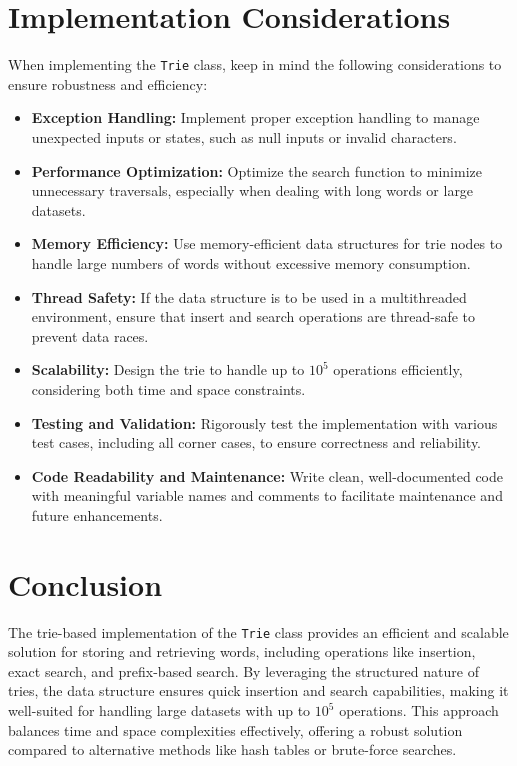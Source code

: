 \section*{Implementation Considerations}

When implementing the \texttt{Trie} class, keep in mind the following considerations to ensure robustness and efficiency:

\begin{itemize}
    \item \textbf{Exception Handling:}  
    Implement proper exception handling to manage unexpected inputs or states, such as null inputs or invalid characters.
    
    \item \textbf{Performance Optimization:}  
    Optimize the search function to minimize unnecessary traversals, especially when dealing with long words or large datasets.
    
    \item \textbf{Memory Efficiency:}  
    Use memory-efficient data structures for trie nodes to handle large numbers of words without excessive memory consumption.
    
    \item \textbf{Thread Safety:}  
    If the data structure is to be used in a multithreaded environment, ensure that insert and search operations are thread-safe to prevent data races.
    
    \item \textbf{Scalability:}  
    Design the trie to handle up to \(10^5\) operations efficiently, considering both time and space constraints.
    
    \item \textbf{Testing and Validation:}  
    Rigorously test the implementation with various test cases, including all corner cases, to ensure correctness and reliability.
    
    \item \textbf{Code Readability and Maintenance:}  
    Write clean, well-documented code with meaningful variable names and comments to facilitate maintenance and future enhancements.
\end{itemize}

\section*{Conclusion}

The trie-based implementation of the \texttt{Trie} class provides an efficient and scalable solution for storing and retrieving words, including operations like insertion, exact search, and prefix-based search. By leveraging the structured nature of tries, the data structure ensures quick insertion and search capabilities, making it well-suited for handling large datasets with up to \(10^5\) operations. This approach balances time and space complexities effectively, offering a robust solution compared to alternative methods like hash tables or brute-force searches.

\printindex